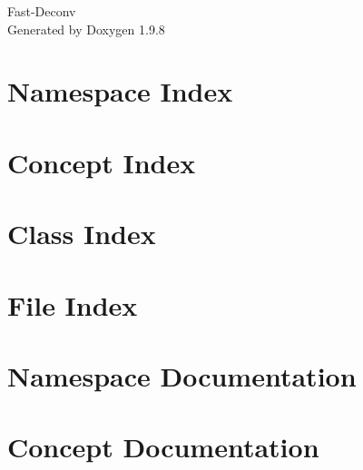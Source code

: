 \documentclass[twoside]{book}
\newcommand{\+}{\discretionary{\mbox{\scriptsize$\hookleftarrow$}}{}{}}
\newcommand{\clearemptydoublepage}{%
    \newpage{\pagestyle{empty}\cleardoublepage}%
  }
\begin{document}
  \raggedbottom
    \hypersetup{pageanchor=false,
                bookmarksnumbered=true,
                pdfencoding=unicode
               }
  \begin{titlepage}
  \vspace*{7cm}
  \begin{center}%
  {\Large Fast-\/\+Deconv}\\
  \vspace*{1cm}
  {\large Generated by Doxygen 1.9.8}\\
  \end{center}
  \end{titlepage}
  \clearemptydoublepage
  \tableofcontents
  \clearemptydoublepage
  \hypersetup{pageanchor=true}
\chapter{Namespace Index}

\chapter{Concept Index}

\chapter{Class Index}

\chapter{File Index}

\chapter{Namespace Documentation}













\chapter{Concept Documentation}




\end{document}
